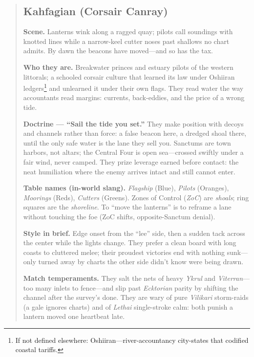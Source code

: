 \documentclass[11pt]{article}
\begin{document}
\begin{quote}
\subsection{Kahfagian (Corsair Canray)}
\noindent\textbf{Scene.} Lanterns wink along a ragged quay; pilots call soundings with knotted lines while a narrow-keel cutter noses past shallows no chart admits. By dawn the beacons have moved—and so has the tax.

\medskip
\noindent\textbf{Who they are.} Breakwater princes and estuary pilots of the western littorals; a schooled corsair culture that learned its law under Oshiiran ledgers\footnote{If not defined elsewhere: Oshiiran—river-accountancy city-states that codified coastal tariffs.} and unlearned it under their own flags. They read water the way accountants read margins: currents, back-eddies, and the price of a wrong tide.

\medskip
\noindent\textbf{Doctrine — “Sail the tide you set.”} They make position with decoys and channels rather than force: a false beacon here, a dredged shoal there, until the only safe water is the lane they sell you. Sanctums are town harbors, not altars; the Central Four is open sea—crossed swiftly under a fair wind, never camped. They prize leverage earned before contact: the neat humiliation where the enemy arrives intact and still cannot enter.

\medskip
\noindent\textbf{Table names (in-world slang).} \emph{Flagship} (Blue), \emph{Pilots} (Oranges), \emph{Moorings} (Reds), \emph{Cutters} (Greens). Zones of Control (\emph{ZoC}) are \emph{shoals}; ring squares are the \emph{shoreline}. To “move the lanterns” is to reframe a lane without touching the foe (ZoC shifts, opposite-Sanctum denial).

\medskip
\noindent\textbf{Style in brief.} Edge onset from the “lee” side, then a sudden tack across the center while the lights change. They prefer a clean board with long coasts to cluttered melee; their proudest victories end with nothing sunk—only turned away by charts the other side didn’t know were being drawn.

\medskip
\noindent\textbf{Match temperaments.} They salt the nets of heavy \textit{Ykrul} and \textit{Viterran}—too many inlets to fence—and slip past \textit{Ecktorian} parity by shifting the channel after the survey’s done. They are wary of pure \textit{Vilikari} storm-raids (a gale ignores charts) and of \textit{Lethai} single-stroke calm: both punish a lantern moved one heartbeat late.


\end{quote}
\end{document}

